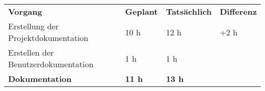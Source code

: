 \begin{tabular}{llll}
\rowcolor{heading}\textbf{Vorgang} & \textbf{Geplant} & \textbf{Tatsächlich} & \textbf{Differenz} \\
Erstellung der Projektdokumentation & 10 h   & 12 h  & +2 h \\
\rowcolor{odd}Erstellen der Benutzerdokumentation & 1 h   & 1 h   &  \\
\hline
\hline
\rowcolor{heading}\textbf{Dokumentation} & \textbf{11 h} & \textbf{13 h} & \textbf{} \\
\end{tabular}
